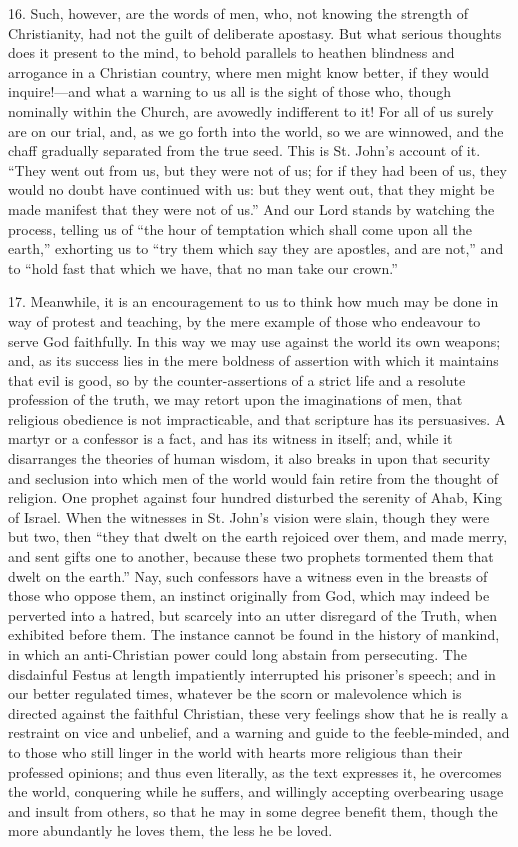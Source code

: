 16. Such, however, are the words of men, who, not knowing the
strength of Christianity, had not the guilt of deliberate apostasy.
But what serious thoughts does it present to the mind, to behold
parallels to heathen blindness and arrogance in a Christian country,
where men might know better, if they would inquire!—and what a
warning to us all is the sight of those who, though nominally within
the Church, are avowedly indifferent to it! For all of us surely are
on our trial, and, as we go forth into the world, so we are winnowed,
and the chaff gradually separated from the true seed. This is St.
John's account of it. ``They went out from us, but they were not
of us; for if they had been of us, they would no doubt have continued
with us: but they went out, that they might be made manifest that they
were not of us.'' And our Lord stands by watching the process,
telling us of ``the hour of temptation which shall come upon all
the earth,'' exhorting us to ``try them which say they are
apostles, and are not,'' and to ``hold fast that which we
have, that no man take our crown.''

17. Meanwhile, it is an encouragement to us to think how much may
be done in way of protest and teaching, by the mere example of those
who endeavour to serve God faithfully. In this way we may use against
the world its own weapons; and, as its success lies in the mere
boldness of assertion with which it maintains that evil is good, so by
the counter-assertions of a strict life and a resolute profession of
the truth, we may retort upon the imaginations of men, that religious
obedience is not impracticable, and that scripture has its persuasives.
A martyr or a confessor is a fact, and has its witness in itself; and,
while it disarranges the theories of human wisdom, it also breaks in
upon that security and seclusion into which men of the world would
fain retire from the thought of religion. One prophet against four
hundred disturbed the serenity of Ahab, King of Israel. When the
witnesses in St. John's vision were slain, though they were but two,
then ``they that dwelt on the earth rejoiced over them, and made
merry, and sent gifts one to another, because these two prophets
tormented them that dwelt on the earth.'' Nay, such confessors
have a witness even in the breasts of those who oppose them, an
instinct originally from God, which may indeed be perverted into a
hatred, but scarcely into an utter disregard of the Truth, when
exhibited before them. The instance cannot be found in the history of
mankind, in which an anti-Christian power could long abstain from
persecuting. The disdainful Festus at length impatiently interrupted
his prisoner's speech; and in our better regulated times, whatever be
the scorn or malevolence which is directed against the faithful
Christian, these very feelings show that he is really a restraint on
vice and unbelief, and a warning and guide to the feeble-minded, and
to those who still linger in the world with hearts more religious than
their professed opinions; and thus even literally, as the text
expresses it, he overcomes the world, conquering while he suffers, and
willingly accepting overbearing usage and insult from others, so that
he may in some degree benefit them, though the more abundantly he
loves them, the less he be loved.

